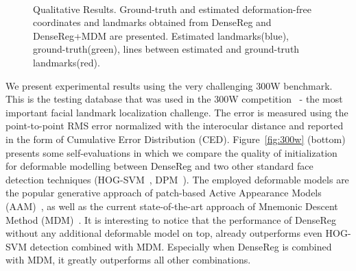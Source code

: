 \documentclass[10pt,twocolumn,letterpaper]{article}
\begin{document}
\begin{figure*}[h]
\hspace{0.0005cm}
\hspace{0.0005cm}
\hspace{0.0005cm}
\\
\vspace{-0.13cm}


\caption{Qualitative Results. Ground-truth and estimated deformation-free coordinates and  landmarks obtained from DenseReg and DenseReg+MDM are presented. Estimated landmarks(blue), ground-truth(green), lines between estimated and ground-truth landmarks(red).}
\label{fig:qualitative}
\vspace{-0.3cm}

\end{figure*}%


We present experimental results using the very challenging 300W benchmark. This is the testing database that was used in the 300W competition~\cite{sagonas_iccv_300w_2013,sagonas2016300} - the most important facial landmark localization challenge. The error is measured using the point-to-point RMS error normalized with the interocular distance and reported in the form of Cumulative Error Distribution (CED). Figure~\ref{fig:300w} (bottom) presents some self-evaluations in which we compare the quality of initialization for deformable modelling between DenseReg and two other standard face detection techniques (HOG-SVM~\cite{king2015max}, DPM~\cite{mathias2014face}). The employed deformable models are the popular generative approach of patch-based Active Appearance Models (AAM)~\cite{papandreou2008adaptive,tzimiropoulos2014gauss,antonakos2015feature}, as well as the current state-of-the-art approach of Mnemonic Descent Method (MDM)~\cite{trigeorgis2016mnemonic}. It is interesting to notice that the performance of DenseReg without any additional deformable model on top, already outperforms even HOG-SVM detection combined with MDM. Especially when DenseReg is combined with MDM, it greatly outperforms all other combinations.
\end{document}
